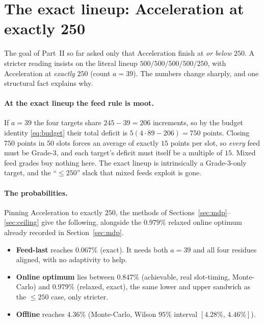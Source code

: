 \documentclass[11pt]{article}
\theoremstyle{remark}
\begin{document}
\section{The exact lineup: Acceleration at exactly 250}\label{sec:exact250}

The goal of Part~II so far asked only that Acceleration finish at \emph{or below}
$250$. A stricter reading insists on the literal lineup $500/500/500/500/250$, with
Acceleration at \emph{exactly} $250$ (count $a=39$). The numbers change sharply, and
one structural fact explains why.

\paragraph{At the exact lineup the feed rule is moot.}
If $a=39$ the four targets share $245-39=206$ increments, so by the budget identity
\eqref{eq:budget} their total deficit is $5(4\cdot 89-206)=750$ points. Closing $750$
points in $50$ slots forces an average of exactly $15$ points per slot, so
\emph{every} feed must be Grade-3, and each target's deficit must itself be a multiple
of $15$. Mixed feed grades buy nothing here. The exact lineup is intrinsically a
Grade-3-only target, and the ``$\le 250$'' slack that mixed feeds exploit is gone.

\paragraph{The probabilities.}
Pinning Acceleration to exactly $250$, the methods of
Sections~\ref{sec:mdp}--\ref{sec:ceiling} give the following, alongside the $0.979\%$
relaxed online optimum already recorded in Section~\ref{sec:mdp}.
\begin{itemize}[leftmargin=1.4em]
  \item \textbf{Feed-last} reaches $0.067\%$ (exact). It needs both $a=39$ and all
        four residues aligned, with no adaptivity to help.
  \item \textbf{Online optimum} lies between $0.847\%$ (achievable, real slot-timing,
        Monte-Carlo) and $0.979\%$ (relaxed, exact), the same lower and upper sandwich
        as the $\le 250$ case, only stricter.
  \item \textbf{Offline} reaches $4.36\%$ (Monte-Carlo, Wilson $95\%$ interval
        $[4.28\%,\,4.46\%]$).
\end{itemize}
\end{document}
